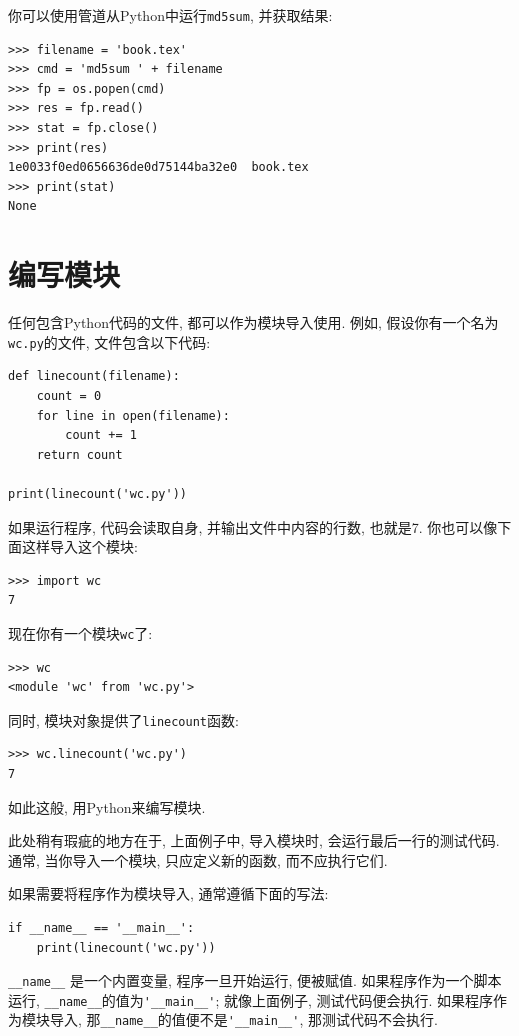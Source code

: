 \documentclass[10pt]{book}
\begin{document}
你可以使用管道从Python中运行{\tt md5sum}, 并获取结果:

\begin{verbatim}
>>> filename = 'book.tex'
>>> cmd = 'md5sum ' + filename
>>> fp = os.popen(cmd)
>>> res = fp.read()
>>> stat = fp.close()
>>> print(res)
1e0033f0ed0656636de0d75144ba32e0  book.tex
>>> print(stat)
None
\end{verbatim}



\section{编写模块}
\label{modules}
任何包含Python代码的文件, 都可以作为模块导入使用. 
例如, 假设你有一个名为{\tt wc.py}的文件, 文件包含以下代码:

\begin{verbatim}
def linecount(filename):
    count = 0
    for line in open(filename):
        count += 1
    return count

print(linecount('wc.py'))
\end{verbatim}
%
如果运行程序, 代码会读取自身, 并输出文件中内容的行数, 也就是7.
你也可以像下面这样导入这个模块:

\begin{verbatim}
>>> import wc
7
\end{verbatim}
%
现在你有一个模块{\tt wc}了:

\begin{verbatim}
>>> wc
<module 'wc' from 'wc.py'>
\end{verbatim}
%
同时, 模块对象提供了\verb"linecount"函数:

\begin{verbatim}
>>> wc.linecount('wc.py')
7
\end{verbatim}
%
如此这般, 用Python来编写模块. 

此处稍有瑕疵的地方在于, 上面例子中, 导入模块时, 
会运行最后一行的测试代码. 
通常, 当你导入一个模块, 只应定义新的函数, 而不应执行它们.

如果需要将程序作为模块导入, 通常遵循下面的写法:

\begin{verbatim}
if __name__ == '__main__':
    print(linecount('wc.py'))
\end{verbatim}
%
\verb"__name__" 是一个内置变量, 程序一旦开始运行, 便被赋值. 
如果程序作为一个脚本运行, \verb"__name__"的值为\verb"'__main__'";
就像上面例子, 测试代码便会执行. 
如果程序作为模块导入, 那\verb"__name__"的值便不是\verb"'__main__'", 
那测试代码不会执行. 
\end{document}
